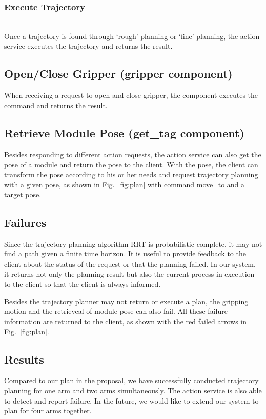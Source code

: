 \subsubsection{Execute Trajectory}~\\
Once a trajectory is found through `rough' planning or `fine' planning, the action service executes the trajectory and returns the result.


\subsection{Open/Close Gripper (gripper component)}
When receiving a request to open and close gripper, the component executes the command and returns the result.

\subsection{Retrieve Module Pose (get\_tag component)}
Besides responding to different action requests, the action service can also get the pose of a module and return the pose to the client. With the pose, the client can transform the pose according to his or her needs and request trajectory planning with a given pose, as shown in Fig.~\ref{fig:plan} with command move\_to and a target pose.


\subsection{Failures}
Since the trajectory planning algorithm RRT is probabilistic complete, it may not find a path given a finite time horizon. It is useful to provide feedback to the client about the status of the request or that the planning failed. In our system, it returns not only the planning result but also the current process in execution to the client so that the client is always informed.

Besides the trajectory planner may not return or execute a plan, the gripping motion and the retrieveal of module pose can also fail. All these failure information are returned to the client, as shown with the red failed arrows in Fig.~\ref{fig:plan}.

\subsection{Results}
Compared to our plan in the proposal, we have successfully conducted trajectory planning for one arm and two arms simultaneously. The action service is also able to detect and report failure. In the future, we would like to extend our system to plan for four arms together. 

